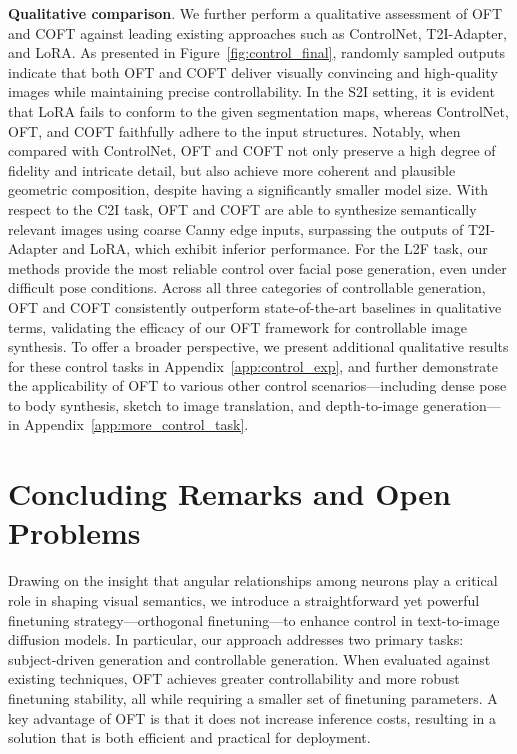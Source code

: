 \textbf{Qualitative comparison}. We further perform a qualitative assessment of OFT and COFT against leading existing approaches such as ControlNet, T2I-Adapter, and LoRA. As presented in Figure~\ref{fig:control_final}, randomly sampled outputs indicate that both OFT and COFT deliver visually convincing and high-quality images while maintaining precise controllability. In the S2I setting, it is evident that LoRA fails to conform to the given segmentation maps, whereas ControlNet, OFT, and COFT faithfully adhere to the input structures. Notably, when compared with ControlNet, OFT and COFT not only preserve a high degree of fidelity and intricate detail, but also achieve more coherent and plausible geometric composition, despite having a significantly smaller model size. With respect to the C2I task, OFT and COFT are able to synthesize semantically relevant images using coarse Canny edge inputs, surpassing the outputs of T2I-Adapter and LoRA, which exhibit inferior performance. For the L2F task, our methods provide the most reliable control over facial pose generation, even under difficult pose conditions. Across all three categories of controllable generation, OFT and COFT consistently outperform state-of-the-art baselines in qualitative terms, validating the efficacy of our OFT framework for controllable image synthesis. To offer a broader perspective, we present additional qualitative results for these control tasks in Appendix~\ref{app:control_exp}, and further demonstrate the applicability of OFT to various other control scenarios—including dense pose to body synthesis, sketch to image translation, and depth-to-image generation—in Appendix~\ref{app:more_control_task}.

\section{Concluding Remarks and Open Problems}

Drawing on the insight that angular relationships among neurons play a critical role in shaping visual semantics, we introduce a straightforward yet powerful finetuning strategy—orthogonal finetuning—to enhance control in text-to-image diffusion models. In particular, our approach addresses two primary tasks: subject-driven generation and controllable generation. When evaluated against existing techniques, OFT achieves greater controllability and more robust finetuning stability, all while requiring a smaller set of finetuning parameters. A key advantage of OFT is that it does not increase inference costs, resulting in a solution that is both efficient and practical for deployment.

